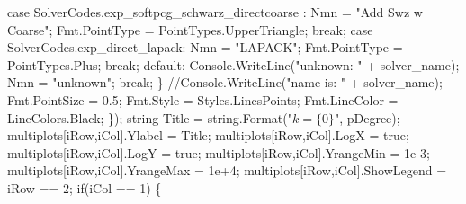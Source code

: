 {\btab \btab    case SolverCodes.exp\_softpcg\_schwarz\_directcoarse : \newline 
\btab \btab \btab    Nmn           = "Add Swz w Coarse";\newline 
\btab \btab \btab    Fmt.PointType = PointTypes.UpperTriangle;\newline 
\btab \btab \btab    break;\newline 
\btab \btab    case SolverCodes.exp\_direct\_lapack: \newline 
\btab \btab \btab    Nmn           = "LAPACK"; \newline 
\btab \btab \btab    Fmt.PointType = PointTypes.Plus;\newline 
\btab \btab \btab    break;\newline 
\btab \btab    default:\newline 
\btab \btab \btab    Console.WriteLine("unknown: " + solver\_name); \newline 
\btab \btab \btab    Nmn = "unknown"; \newline 
\btab \btab \btab    break;\newline 
\btab \btab    \} \newline 
\btab \btab    //Console.WriteLine("name is: " + solver\_name); \newline 
\btab \btab    Fmt.PointSize = 0.5;\newline 
\btab \btab    Fmt.Style     = Styles.LinesPoints;\newline 
\btab \btab    Fmt.LineColor = LineColors.Black;\newline 
\btab    \});\newline 
 \newline 
\btab string Title = string.Format("$k = \{0\}$", pDegree);\newline 
\btab multiplots[iRow,iCol].Ylabel = Title;\newline 
\btab multiplots[iRow,iCol].LogX = true;\newline 
\btab multiplots[iRow,iCol].LogY = true;\newline 
 \newline 
\btab multiplots[iRow,iCol].YrangeMin = 1e-3;\newline 
\btab multiplots[iRow,iCol].YrangeMax = 1e+4;\newline 
 \newline 
\btab multiplots[iRow,iCol].ShowLegend = iRow == 2;\newline 
 \newline 
\btab if(iCol == 1) \{\newline 
}
